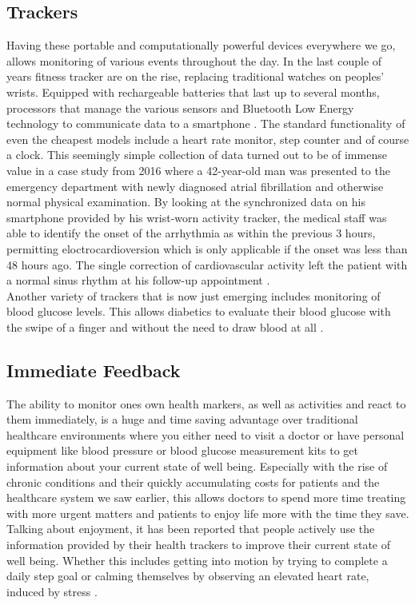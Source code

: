 \subsection{Trackers}
Having these portable and computationally powerful devices everywhere we go, allows monitoring of various events throughout the day. In the last couple of years fitness tracker are on the rise, replacing traditional watches on peoples' wrists. Equipped with rechargeable batteries that last up to several months, processors that manage the various sensors and Bluetooth Low Energy technology to communicate data to a smartphone \cite{trackerDef}. The standard functionality of even the cheapest models include a heart rate monitor, step counter and of course a clock. This seemingly simple collection of data turned out to be of immense value in a case study from 2016 where a 42-year-old man was presented to the emergency department with newly diagnosed atrial fibrillation and otherwise normal physical examination. By looking at the synchronized data on his smartphone provided by his wrist-worn activity tracker, the medical staff was able to identify the onset of the arrhythmia as within the previous 3 hours, permitting eloctrocardioversion which is only applicable if the onset was less than 48 hours ago. The single correction of cardiovascular activity left the patient with a normal sinus rhythm at his follow-up appointment \cite{rudner2016interrogation}. \\
Another variety of trackers that is now just emerging includes monitoring of blood glucose levels. This allows diabetics to evaluate their blood glucose with the swipe of a finger and without the need to draw blood at all \cite{glucoseTracker}.
\subsection{Immediate Feedback}
The ability to monitor ones own health markers, as well as activities and react to them immediately, is a huge and time saving advantage over traditional healthcare environments where you either need to visit a doctor or have personal equipment like blood pressure or blood glucose measurement kits to get information about your current state of well being. Especially with the rise of chronic conditions and their quickly accumulating costs for patients and the healthcare system we saw earlier, this allows doctors to spend more time treating with more urgent matters and patients to enjoy life more with the time they save. Talking about enjoyment, it has been reported that people actively use the information provided by their health trackers to improve their current state of well being. Whether this includes getting into motion by trying to complete a daily step goal \cite{rasche2015activity} or calming themselves by observing an elevated heart rate, induced by stress \cite{mayya2015continuous}.
